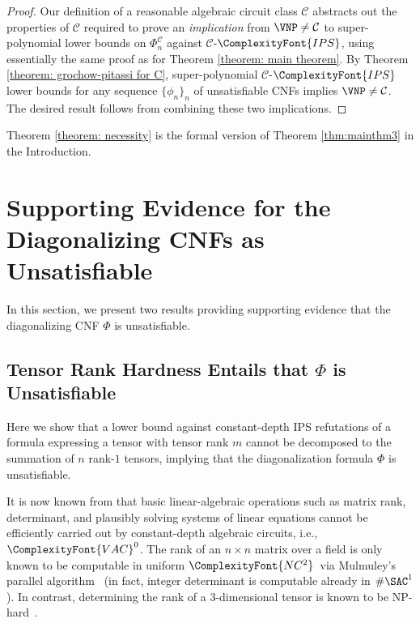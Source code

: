 \documentclass[11pt,letter]{article}
\theoremstyle{remark} %
\newcommand{\IPS}{%
    {
        \ComplexityFont{IPS} 
    }
}
\newcommand{\VAC}{
    {
        \ComplexityFont{VAC}
    }
}
\newcommand{\NCTwo}{\ensuremath{\ComplexityFont{NC^2}}}
\begin{document}
{    \begin{proof}
    Our definition of a reasonable algebraic circuit class $\mathcal{C}$ abstracts out the properties of $\mathcal{C}$ required to prove an {\it implication} from $\VNP \neq \mathcal{C}$ to super-polynomial lower bounds on $\Phi^\mathcal{C}_n$ against $\mathcal{C}$-$\IPS$, using essentially the same proof as for Theorem \ref{theorem: main theorem}. By Theorem \ref{theorem: grochow-pitassi for C}, super-polynomial $\mathcal{C}$-$\IPS$ lower bounds for any sequence $\{\phi_n\}_n$ of unsatisfiable CNFs implies $\VNP \neq \mathcal{C}$. The desired result follows from combining these two implications. 
    \end{proof}

    Theorem \ref{theorem: necessity} is the formal version of Theorem \ref{thm:mainthm3} in the Introduction.

\section{Supporting Evidence for the Diagonalizing CNFs as Unsatisfiable}\label{sec:supporting-evidence}

In this section, we present two results providing supporting evidence that the diagonalizing CNF $\Phi$ is unsatisfiable. 

\subsection{Tensor Rank Hardness Entails that $\Phi$ is Unsatisfiable}

Here we show that a lower bound against constant-depth IPS refutations of a formula expressing a tensor with tensor rank $m$ cannot be decomposed to the summation of $n$ rank-$1$ tensors, implying that the diagonalization formula $\Phi$ is unsatisfiable.

It is now known from \cite{LST25} that basic linear-algebraic operations such as matrix rank, determinant, and plausibly solving systems of linear equations cannot be efficiently carried out by constant-depth algebraic circuits, i.e., $\VAC^0$. The rank of an \(n \times n\) matrix over a field is only known to be computable in uniform \NCTwo\ via Mulmuley’s parallel algorithm~\cite{Mul86} (in fact, integer determinant is computable already in $\#\SAC^1$ \cite{Coo85}). In contrast, determining the rank of a 3-dimensional tensor is known to be NP-hard~\cite{Has90, Shi16}. 



}
\end{document}

